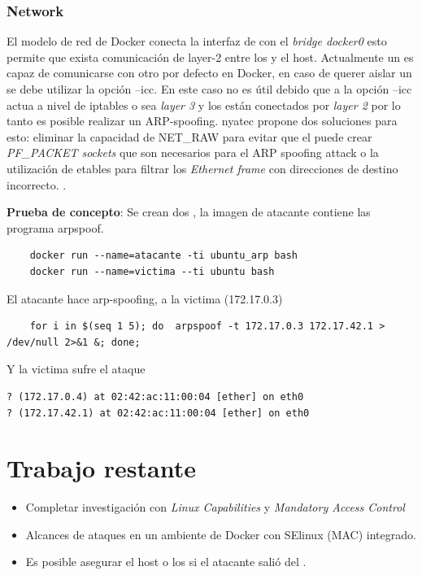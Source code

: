 \documentclass[letter,10pt]{article}
\begin{document}
\subsubsection{Network}

El modelo de red de Docker conecta la interfaz de \container con el 
\emph{bridge docker0} esto permite que exista comunicación de layer-2 entre 
los \containers y el host. Actualmente un \container es capaz de comunicarse
con otro \container por defecto en Docker, en caso de querer aislar un 
\container se debe utilizar la opción --icc. En este caso no es útil debido que 
a la opción --icc actua a nivel de iptables o sea \emph{layer 3} y los 
\containers están conectados por \emph{layer 2} por lo tanto es posible realizar 
un ARP-spoofing. nyatec propone dos soluciones para esto: eliminar la capacidad 
de NET\_RAW para evitar que el \container puede crear \emph{PF\_PACKET sockets} 
que son necesarios para el ARP spoofing attack o la utilización de etables para 
filtrar los \emph{Ethernet frame} con direcciones de destino incorrecto. \cite{nyantec:2015:Online}.

\textbf{Prueba de concepto}:  Se crean dos \containers, la imagen de atacante contiene las programa arpspoof. 
\begin{verbatim}
	docker run --name=atacante -ti ubuntu_arp bash
	docker run --name=victima --ti ubuntu bash
\end{verbatim}

El atacante hace arp-spoofing, a la victima (172.17.0.3)
\begin{verbatim}
	for i in $(seq 1 5); do  arpspoof -t 172.17.0.3 172.17.42.1 > /dev/null 2>&1 &; done;
\end{verbatim}
Y la victima sufre el ataque
\begin{verbatim}
? (172.17.0.4) at 02:42:ac:11:00:04 [ether] on eth0
? (172.17.42.1) at 02:42:ac:11:00:04 [ether] on eth0
\end{verbatim}



\section{Trabajo restante}

\begin{itemize}
	\item Completar investigación con \emph{Linux Capabilities} y \emph{Mandatory Access Control}
	\item Alcances de ataques en un ambiente de Docker con SElinux (MAC) integrado.
	\item Es posible asegurar el host o los \containers   si el atacante salió del \container.
\end{itemize}
\end{document}
